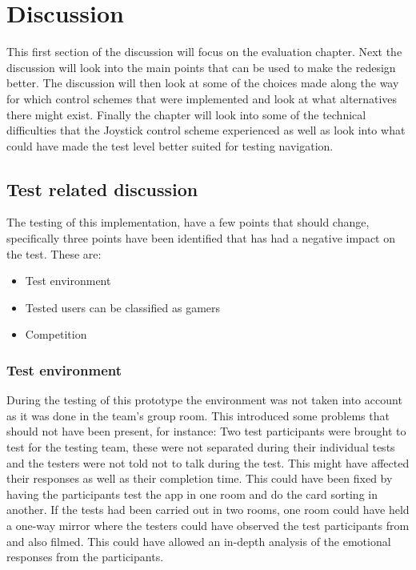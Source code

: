\chapter{Discussion}
This first section of the discussion will focus on the evaluation chapter. Next the discussion will look into the main points that can be used to make the redesign better. The discussion will then look at some of the choices made along the way for which control schemes that were implemented and look at what alternatives there might exist. Finally the chapter will look into some of the technical difficulties that the Joystick control scheme experienced as well as look into what could have made the test level better suited for testing navigation.

\section*{Test related discussion}
The testing of this implementation, have a few points that should change, specifically three points have been identified that has had a negative impact on the test. These are:

\begin{itemize}
\item Test environment
\item Tested users can be classified as gamers
\item Competition
\end{itemize}

\subsection*{Test environment}
During the testing of this prototype the environment was not taken into account as it was done in the team's group room. This introduced some problems that should not have been present, for instance: Two test participants were brought to test for the testing team, these were not separated during their individual tests and the testers were not told not to talk during the test. This might have affected their responses as well as their completion time. This could have been fixed by having the participants test the app in one room and do the card sorting in another. If the tests had been carried out in two rooms, one room could have held a one-way mirror where the testers could have observed the test participants from and also filmed. This could have allowed an in-depth analysis of the emotional responses from the participants. 

